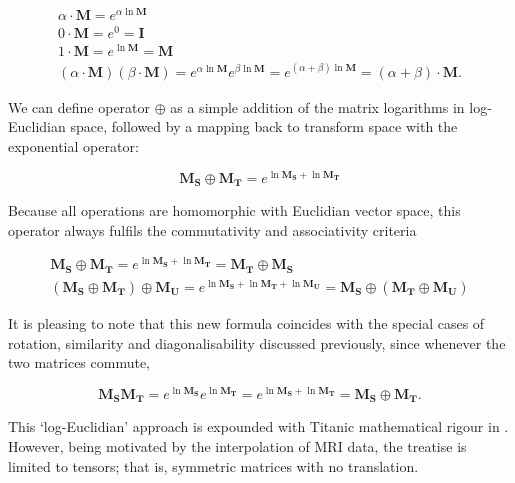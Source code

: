         \begin{gather}
          \alpha \cdot \mathbf{M} = e^{\alpha\ln\mathbf{M}} \\
          0 \cdot \mathbf{M} = e^0 = \mathbf{I} \\
          1 \cdot \mathbf{M} = e^{\ln\mathbf{M}} = \mathbf{M} \\
          (\alpha \cdot \mathbf{M})(\beta \cdot \mathbf{M}) = e^{\alpha\ln\mathbf{M}}e^{\beta\ln\mathbf{M}}
                                                            = e^{(\alpha + \beta)\ln\mathbf{M}}
                                                            = (\alpha + \beta) \cdot \mathbf{M}.
        \end{gather}
        
        We can define operator $\oplus$ as a simple addition of the matrix logarithms in log-Euclidian space, followed by a mapping back to transform space with the exponential operator:
        
        \begin{equation}
          \mathbf{M_S} \oplus \mathbf{M_T} = e^{\ln\mathbf{M_S} + \ln\mathbf{M_T}}
        \end{equation}
        
        Because all operations are homomorphic with Euclidian vector space, this operator always fulfils the commutativity and associativity criteria
        
        \begin{gather}
          \mathbf{M_S} \oplus \mathbf{M_T} = e^{\ln\mathbf{M_S} + \ln\mathbf{M_T}} = \mathbf{M_T} \oplus \mathbf{M_S} \\
          (\mathbf{M_S}\oplus\mathbf{M_T})\oplus\mathbf{M_U} = e^{\ln\mathbf{M_S} + \ln\mathbf{M_T} + \ln\mathbf{M_U}} = \mathbf{M_S}\oplus(\mathbf{M_T}\oplus\mathbf{M_U})
        \end{gather}
        
        It is pleasing to note that this new formula coincides with the special cases of rotation, similarity and diagonalisability discussed previously, since whenever the two matrices commute,
        
        \begin{equation}
          \mathbf{M_SM_T} = e^{\ln\mathbf{M_S}}e^{\ln\mathbf{M_T}} = e^{\ln\mathbf{M_S} + \ln\mathbf{M_T}} = \mathbf{M_S} \oplus \mathbf{M_T}.
        \end{equation}
        
        This `log-Euclidian' approach is expounded with Titanic mathematical rigour in \cite{Arsigny2005}. However, being motivated by the interpolation of MRI data, the treatise is limited to tensors; that is, symmetric matrices with no translation.
        
